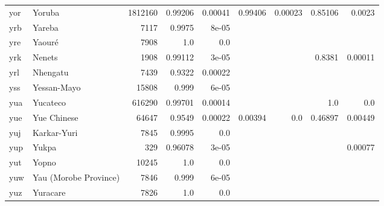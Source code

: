 \documentclass[11pt]{article}
\begin{document}
\begin{table*}[h]
{\begin{tabular}{llrrrrrrr}
yor         & Yoruba         & 1812160         & 0.99206         & 0.00041         & 0.99406         & 0.00023         & 0.85106         & 0.0023         \\

yrb         & Yareba         & 7117         & 0.9975         & 8e-05         &          &          &          &          \\

yre         & Yaouré         & 7908         & 1.0         & 0.0         &          &          &          &          \\

yrk         & Nenets         & 1908         & 0.99112         & 3e-05         &          &          & 0.8381         & 0.00011         \\

yrl         & Nhengatu         & 7439         & 0.9322         & 0.00022         &          &          &          &          \\

yss         & Yessan-Mayo         & 15808         & 0.999         & 6e-05         &          &          &          &          \\

yua         & Yucateco         & 616290         & 0.99701         & 0.00014         &          &          & 1.0         & 0.0         \\

yue         & Yue Chinese         & 64647         & 0.9549         & 0.00022         & 0.00394         & 0.0         & 0.46897         & 0.00449         \\

yuj         & Karkar-Yuri         & 7845         & 0.9995         & 0.0         &          &          &          &          \\

yup         & Yukpa         & 329         & 0.96078         & 3e-05         &          &          &          & 0.00077         \\

yut         & Yopno         & 10245         & 1.0         & 0.0         &          &          &          &          \\

yuw         & Yau (Morobe Province)         & 7846         & 0.999         & 6e-05         &          &          &          &          \\

yuz         & Yuracare         & 7826         & 1.0         & 0.0         &          &          &          &          \\


\end{tabular}}
\end{table*}
\end{document}
